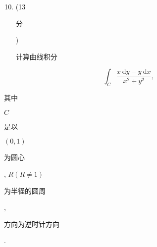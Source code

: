\documentclass[10pt]{article}
\begin{document}
\begin{enumerate}
  \setcounter{enumi}{9}
  \item (13 \begin{CJK}{UTF8}{mj}分\end{CJK}) \begin{CJK}{UTF8}{mj}计算曲线积分\end{CJK}
\end{enumerate}
$$
\int_{C} \frac{x \mathrm{~d} y-y \mathrm{~d} x}{x^{2}+y^{2}},
$$
\begin{CJK}{UTF8}{mj}其中\end{CJK} $C$ \begin{CJK}{UTF8}{mj}是以\end{CJK} $(0,1)$ \begin{CJK}{UTF8}{mj}为圆心\end{CJK}, $R(R \neq 1)$ \begin{CJK}{UTF8}{mj}为半径的圆周\end{CJK}, \begin{CJK}{UTF8}{mj}方向为逆时针方向\end{CJK}.
\end{document}
